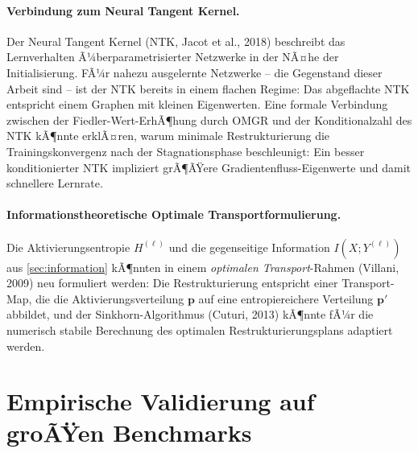 ﻿\documentclass[12pt, a4paper, openany]{report}
\begin{document}
\paragraph{Verbindung zum Neural Tangent Kernel.}
Der Neural Tangent Kernel (NTK, Jacot et al., 2018) beschreibt das
Lernverhalten Ã¼berparametrisierter Netzwerke in der NÃ¤he der Initialisierung.
FÃ¼r nahezu ausgelernte Netzwerke -- die Gegenstand dieser Arbeit sind --
ist der NTK bereits in einem flachen Regime: Das abgeflachte NTK
entspricht einem Graphen mit kleinen Eigenwerten.  Eine formale
Verbindung zwischen der Fiedler-Wert-ErhÃ¶hung durch OMGR und der
Konditionalzahl des NTK kÃ¶nnte erklÃ¤ren, warum minimale Restrukturierung
die Trainingskonvergenz nach der Stagnationsphase beschleunigt: Ein
besser konditionierter NTK impliziert grÃ¶ÃŸere Gradientenfluss-Eigenwerte
und damit schnellere Lernrate.

\paragraph{Informationstheoretische Optimale Transportformulierung.}
Die Aktivierungsentropie $H^{(\ell)}$ und die gegenseitige Information
$I(X; Y^{(\ell)})$ aus \cref{sec:information} kÃ¶nnten in einem
\emph{optimalen Transport}-Rahmen (Villani, 2009) neu formuliert werden:
Die Restrukturierung entspricht einer Transport-Map, die die
Aktivierungsverteilung $\bm{p}$ auf eine entropiereichere Verteilung
$\bm{p}'$ abbildet, und der Sinkhorn-Algorithmus (Cuturi, 2013) kÃ¶nnte
fÃ¼r die numerisch stabile Berechnung des optimalen Restrukturierungsplans
adaptiert werden.

\section{Empirische Validierung auf groÃŸen Benchmarks}
\label{sec:outlook_empirical}
\end{document}
